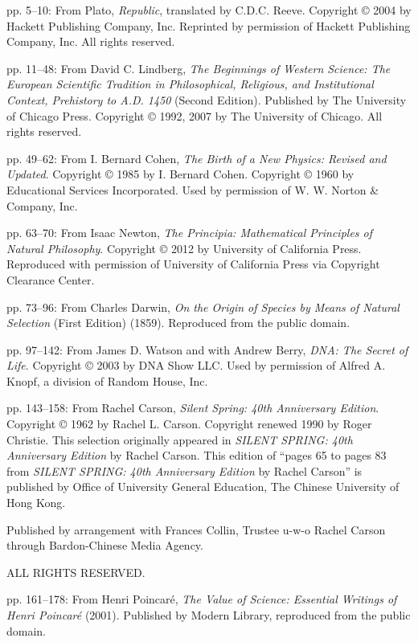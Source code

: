 \documentclass[UTF8,zihao=-4]{ctexart}
\begin{document}
\vspace{0.5em}

\noindent pp. 5--10: From Plato, \textit{Republic}, translated by C.D.C. Reeve. Copyright © 2004 by Hackett Publishing Company, Inc. Reprinted by permission of Hackett Publishing Company, Inc. All rights reserved.

\noindent pp. 11--48: From David C. Lindberg, \textit{The Beginnings of Western Science: The European Scientific Tradition in Philosophical, Religious, and Institutional Context, Prehistory to A.D. 1450} (Second Edition). Published by The University of Chicago Press. Copyright © 1992, 2007 by The University of Chicago. All rights reserved.

\noindent pp. 49--62: From I. Bernard Cohen, \textit{The Birth of a New Physics: Revised and Updated}. Copyright © 1985 by I. Bernard Cohen. Copyright © 1960 by Educational Services Incorporated. Used by permission of W. W. Norton \& Company, Inc.

\noindent pp. 63--70: From Isaac Newton, \textit{The Principia: Mathematical Principles of Natural Philosophy}. Copyright © 2012 by University of California Press. Reproduced with permission of University of California Press via Copyright Clearance Center.

\noindent pp. 73--96: From Charles Darwin, \textit{On the Origin of Species by Means of Natural Selection} (First Edition) (1859). Reproduced from the public domain.

\noindent pp. 97--142: From James D. Watson and with Andrew Berry, \textit{DNA: The Secret of Life}. Copyright © 2003 by DNA Show LLC. Used by permission of Alfred A. Knopf, a division of Random House, Inc.

\noindent pp. 143--158: From Rachel Carson, \textit{Silent Spring: 40th Anniversary Edition}. Copyright © 1962 by Rachel L. Carson. Copyright renewed 1990 by Roger Christie. This selection originally appeared in \textit{SILENT SPRING: 40th Anniversary Edition} by Rachel Carson. This edition of ``pages 65 to pages 83 from \textit{SILENT SPRING: 40th Anniversary Edition} by Rachel Carson'' is published by Office of University General Education, The Chinese University of Hong Kong.

\noindent Published by arrangement with Frances Collin, Trustee u-w-o Rachel Carson through Bardon-Chinese Media Agency.

\noindent ALL RIGHTS RESERVED.

\noindent pp. 161--178: From Henri Poincaré, \textit{The Value of Science: Essential Writings of Henri Poincaré} (2001). Published by Modern Library, reproduced from the public domain.
\end{document}
